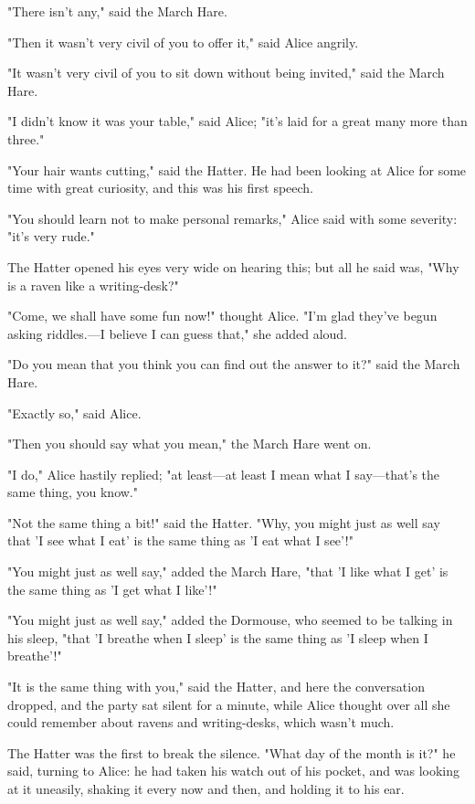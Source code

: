"There isn't any," said the March Hare.

"Then it wasn't very civil of you to offer it," said Alice angrily.

"It wasn't very civil of you to sit down without being invited," said the March Hare.

"I didn't know it was your table," said Alice; "it's laid for a great many more than three."

"Your hair wants cutting," said the Hatter. He had been looking at Alice for some time with great curiosity, and this was his first speech.

"You should learn not to make personal remarks," Alice said with some severity: "it's very rude."

The Hatter opened his eyes very wide on hearing this; but all he said was, "Why is a raven like a writing-desk?"

"Come, we shall have some fun now!" thought Alice. "I'm glad they've begun asking riddles.—I believe I can guess that," she added aloud.

"Do you mean that you think you can find out the answer to it?" said the March Hare.

"Exactly so," said Alice.

​"Then you should say what you mean," the March Hare went on.

"I do," Alice hastily replied; "at least—at least I mean what I say—that's the same thing, you know."

"Not the same thing a bit!" said the Hatter. "Why, you might just as well say that 'I see what I eat' is the same thing as 'I eat what I see'!"

"You might just as well say," added the March Hare, "that 'I like what I get' is the same thing as 'I get what I like'!"

"You might just as well say," added the Dormouse, who seemed to be talking in his sleep, "that 'I breathe when I sleep' is the same thing as 'I sleep when I breathe'!"

"It is the same thing with you," said the Hatter, and here the conversation dropped, and the party sat silent for a minute, while Alice thought over all she could remember about ravens and writing-desks, which wasn't much.

The Hatter was the first to break the silence. ​"What day of the month is it?" he said, turning to Alice: he had taken his watch out of his pocket, and was looking at it uneasily, shaking it every now and then, and holding it to his ear.

